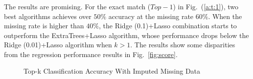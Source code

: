   The results are promising. For the exact match ($Top-1$) in Fig.~(\ref{a:t:1}), two best algorithms achieves over 
  $50\%$ accuracy at the missing rate $60\%$. When the missing rate is higher than $40\%$, the Ridge (0.1)+Lasso combination starts to outperform the ExtraTrees+Lasso algorithm, whose performance drops below the Ridge (0.01)+Lasso algorithm when $k>1$. The results show some disparities from the regression performance results in Fig.~\ref{fig:score}. 
   
    \begin{figure}[!ht]
    \hfill
    \hfill
    \hfill
    
    \caption{Top-k Classification Accuracy With Imputed Missing Data}
    \label{fig:topk}
  \end{figure}
  
  
  